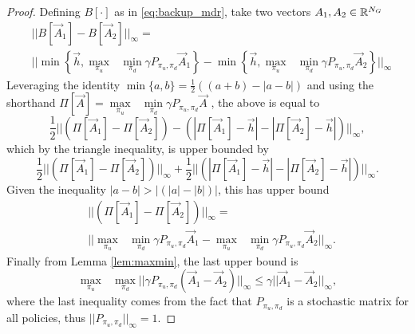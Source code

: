 \begin{proof} Defining $B[\cdot]$ as in \eqref{eq:backup_mdr}, take two vectors $A_1, A_2 \in \mathbb{R}^{N_G}$
\begin{equation*}
\begin{split}
&||B[\vec{A}_1] - B[\vec{A}_2]||_{\infty}=\\
&||\min\left\{ \vec{h}, \underset{\pi_u}{\max}\text{ }\underset{ \pi_d}{\min} \gamma P_{\pi_u, \pi_d} \vec{A}_1 \right \}  - \min\left\{ \vec{h}, \underset{\pi_u}{\max}\text{ }\underset{ \pi_d}{\min} \gamma P_{\pi_u, \pi_d} \vec{A}_2 \right \}||_{\infty}
\end{split}
\end{equation*}%
\noindent Leveraging the identity $\min\{a,b\} = \frac{1}{2}((a+b)- |a-b|)$ and using the shorthand $\Pi[\vec{A}]=\underset{\pi_u}{\max}\text{ }\underset{ \pi_d}{\min} \gamma P_{\pi_u, \pi_d} \vec{A}$ , the above is equal to 
%
\begin{equation*}
\frac{1}{2} ||(\Pi[\vec{A}_1]  - \Pi[\vec{A}_2] ) -  (|\Pi[\vec{A}_1]-\vec{h}|  - |\Pi[\vec{A}_2]-\vec{h}|)||_{\infty},
\end{equation*}%
\noindent which by the triangle inequality, is upper bounded by
%
\begin{equation*}
\frac{1}{2} ||(\Pi[\vec{A}_1]  - \Pi[\vec{A}_2] )||_{\infty} + \frac{1}{2}  ||(|\Pi[\vec{A}_1]-\vec{h}|  - |\Pi[\vec{A}_2]-\vec{h}|)||_{\infty}.
\end{equation*}%
\noindent Given the inequality $|a-b| > |(|a|-|b|)|$, this has upper bound
%
\begin{equation*}
\begin{split}
&||(\Pi[\vec{A}_1]  - \Pi[\vec{A}_2] )||_{\infty}=\\ 
&||\underset{\pi_u}{\max}\text{ }\underset{ \pi_d}{\min} \gamma P_{\pi_u, \pi_d}\vec{A}_1 - \underset{\pi_u}{\max}\text{ }\underset{ \pi_d}{\min} \gamma P_{\pi_u, \pi_d} \vec{A}_2||_{\infty}.
\end{split}
\end{equation*}%
\noindent Finally from Lemma \ref{lem:maxmin}, the last upper bound is 
\begin{equation*}
\underset{\pi_u}{\max}\text{ }\underset{ \pi_d}{\max} ||\gamma P_{\pi_u, \pi_d} (\vec{A}_1 - \vec{A}_2)||_{\infty} \leq \gamma||\vec{A}_1 - \vec{A}_2||_{\infty},
\end{equation*}%
\noindent where the last inequality comes from the fact that $P_{\pi_u, \pi_d}$ is a stochastic matrix for all policies, thus $||P_{\pi_u, \pi_d}||_{\infty} = 1$.
\end{proof}



